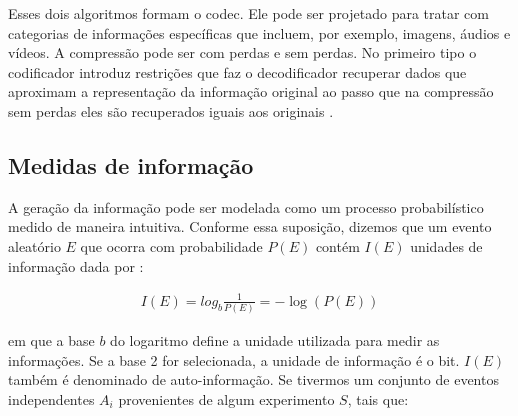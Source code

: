 
Esses dois algoritmos formam o \acrshort{codec}. Ele pode ser projetado para tratar com categorias de informações específicas que incluem, por exemplo, imagens, áudios e vídeos. 
A compressão pode ser com perdas e sem perdas. No primeiro tipo o codificador introduz restrições que faz o decodificador recuperar dados que aproximam a representação da informação original ao passo que na compressão sem perdas  eles são recuperados iguais aos originais \cite{sayood2017introduction}. 

\subsection{Medidas de informação}


A geração da informação pode ser modelada como um processo probabilístico medido de maneira intuitiva. Conforme essa suposição, dizemos que um evento aleatório $E$ que ocorra com probabilidade $P(E)$ contém $I(E)$ unidades de informação dada por \cite{marques1999processamento}:

\begin{equation}
\begin{aligned}
I(E) = log_{b}\frac{1}{P(E)} = - \log (P(E)) 
\end{aligned}
\end{equation}

\noindent em que a base $b$ do logaritmo define a unidade utilizada para medir as informações. Se a base 2 for selecionada, a unidade de informação é o bit. $I(E)$ também é denominado de auto-informação. Se tivermos um conjunto de eventos independentes $A_i$ provenientes de algum experimento $S$, tais que:

